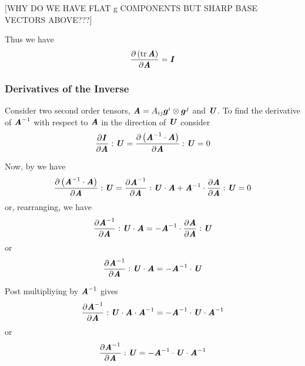 [WHY DO WE HAVE FLAT g COMPONENTS BUT SHARP BASE VECTORS ABOVE???]
    
Thus we have
\begin{equation}
  \delby{\pbrac{\trace{}{\tensortwo{A}}}}{\tensortwo{A}}=\identitytensortwo
  \label{eqn:DerivTraceTensorSecondOrder}
\end{equation}

\subsubsection{Derivatives of the Inverse}
\label{subsubsec:InverseDerivativeSecondOrder}

Consider two second order tensors, $\boldsymbol{\mathit{A}}=A_{ij}  \boldsymbol{g} ^{i} \otimes  \boldsymbol{g} ^{j} $ and $\boldsymbol{\mathit{U}}$. To
find the derivative of ${\boldsymbol{\mathit{A}}}^{-1}$ with respect to
$\boldsymbol{\mathit{A}}$ in the direction of $\boldsymbol{\mathit{U}}$ consider
\begin{equation}
    \dfrac{\partial   \boldsymbol{\mathit{ I }}  }{\partial \boldsymbol{\mathit{A}}}  : \boldsymbol{\mathit{U}} 
  =  \dfrac{\partial \left(  {\boldsymbol{\mathit{A}}}^{-1}  \cdot  \boldsymbol{\mathit{A}}  \right)}{\partial \boldsymbol{\mathit{A}}}  : \boldsymbol{\mathit{U}} =0
\end{equation}

Now, by  we have
\begin{equation}
    \dfrac{\partial \left(  {\boldsymbol{\mathit{A}}}^{-1}  \cdot  \boldsymbol{\mathit{A}}  \right)}{\partial \boldsymbol{\mathit{A}}}  : \boldsymbol{\mathit{U}} =
     \dfrac{\partial {\ensuremath{\boldsymbol{\mathit{A}}}}^{-1}}{\partial \boldsymbol{\mathit{A}}}  : \boldsymbol{\mathit{U}}   \cdot  \boldsymbol{\mathit{A}} 
  + {\boldsymbol{\mathit{A}}}^{-1}  \cdot    \dfrac{\partial \boldsymbol{\mathit{A}}}{\partial \boldsymbol{\mathit{A}}}  : \boldsymbol{\mathit{U}}  =0
\end{equation}
or, rearranging, we have
\begin{equation}
     \dfrac{\partial {\ensuremath{\boldsymbol{\mathit{A}}}}^{-1}}{\partial \boldsymbol{\mathit{A}}}  : \boldsymbol{\mathit{U}}   \cdot  \boldsymbol{\mathit{A}} =- {\boldsymbol{\mathit{A}}}^{-1}  \cdot    \dfrac{\partial \boldsymbol{\mathit{A}}}{\partial \boldsymbol{\mathit{A}}}  : \boldsymbol{\mathit{U}}  
\end{equation}
or
\begin{equation}
     \dfrac{\partial {\ensuremath{\boldsymbol{\mathit{A}}}}^{-1}}{\partial \boldsymbol{\mathit{A}}}  : \boldsymbol{\mathit{U}}   \cdot  \boldsymbol{\mathit{A}} =- {\boldsymbol{\mathit{A}}}^{-1}  \cdot  \boldsymbol{\mathit{U}} 
\end{equation}

Post multipliying by ${\boldsymbol{\mathit{A}}}^{-1}$ gives
\begin{equation}
     \dfrac{\partial {\ensuremath{\boldsymbol{\mathit{A}}}}^{-1}}{\partial \boldsymbol{\mathit{A}}}  : \boldsymbol{\mathit{U}}   \cdot  \boldsymbol{\mathit{A}}  \cdot  {\ensuremath{\boldsymbol{\mathit{A}}}}^{-1} =- {\boldsymbol{\mathit{A}}}^{-1}  \cdot  \boldsymbol{\mathit{U}}  \cdot  {\ensuremath{\boldsymbol{\mathit{A}}}}^{-1} 
\end{equation}
or
\begin{equation}
    \dfrac{\partial {\ensuremath{\boldsymbol{\mathit{A}}}}^{-1}}{\partial \boldsymbol{\mathit{A}}}  : \boldsymbol{\mathit{U}} =- {\boldsymbol{\mathit{A}}}^{-1}  \cdot  \boldsymbol{\mathit{U}}  \cdot  {\ensuremath{\boldsymbol{\mathit{A}}}}^{-1} 
\end{equation}

